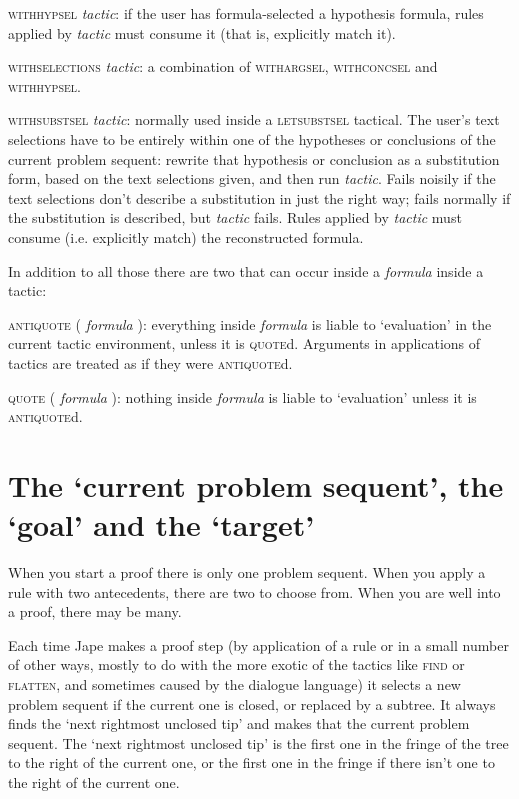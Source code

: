 \textsc{withhypsel} \textit{tactic}: if the user has formula-selected a hypothesis formula, rules applied by \textit{tactic} must consume it (that is, explicitly match it).


\textsc{withselections} \textit{tactic}: a combination of \textsc{withargsel}, \textsc{withconcsel} and \textsc{withhypsel}.


\textsc{withsubstsel} \textit{tactic}: normally used inside a \textsc{letsubstsel} tactical. The user's text selections have to be entirely within one of the hypotheses or conclusions of the current problem sequent: rewrite that hypothesis or conclusion as a substitution form, based on the text selections given, and then run \textit{tactic}. Fails noisily if the text selections don't describe a substitution in just the right way; fails normally if the substitution is described, but \textit{tactic} fails. Rules applied by \textit{tactic} must consume (i.e. explicitly match) the reconstructed formula.


In addition to all those there are two that can occur inside a \textit{formula} inside a tactic:


\textsc{antiquote} ( \textit{formula} ): everything inside \textit{formula} is liable to `evaluation' in the current tactic environment, unless it is \textsc{quote}d. Arguments in applications of tactics are treated as if they were \textsc{antiquote}d.


\textsc{quote} ( \textit{formula} ): nothing inside \textit{formula} is liable to `evaluation' unless it is \textsc{antiquote}d.


\section{The `current problem sequent', the `goal' and the `target'}


When you start a proof there is only one problem sequent. When you apply a rule with two antecedents, there are two to choose from. When you are well into a proof, there may be many.


Each time Jape makes a proof step (by application of a rule or in a small number of other ways, mostly to do with the more exotic of the tactics like \textsc{find} or \textsc{flatten}, and sometimes caused by the dialogue language) it selects a new problem sequent if the current one is closed, or replaced by a subtree. It always finds the `next rightmost unclosed tip' and makes that the current problem sequent. The `next rightmost unclosed tip' is the first one in the fringe of the tree to the right of the current one, or the first one in the fringe if there isn't one to the right of the current one.


